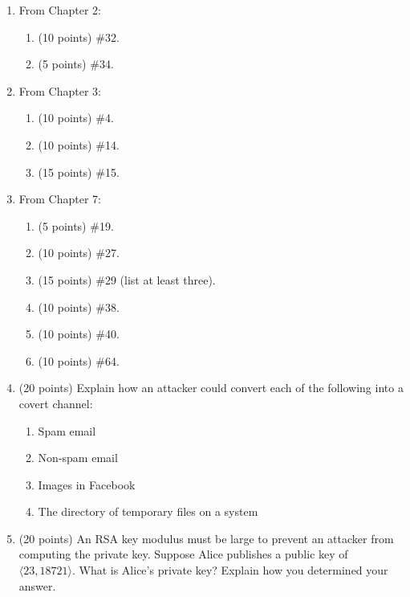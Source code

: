 \documentclass[letterpaper]{article}
\begin{document}
\begin{enumerate}

\item From Chapter 2:
\begin{enumerate}
\item (10 points) \#32.
\item (5 points) \#34.
\end{enumerate}

\item From Chapter 3:
\begin{enumerate}
\item (10 points) \#4.
\item (10 points) \#14.
\item (15 points) \#15.
\end{enumerate}

\item From Chapter 7:
\begin{enumerate}
\item (5 points) \#19.
\item (10 points) \#27.
\item (15 points) \#29 (list at least three).
\item (10 points) \#38.
\item (10 points) \#40.
\item (10 points) \#64.
\end{enumerate}

\item (20 points) Explain how an attacker could convert each of the following into a covert channel:
\begin{enumerate}
\item Spam email
\item Non-spam email
\item Images in Facebook
\item The directory of temporary files on a system
\end{enumerate}

\item (20 points) An RSA key modulus must be large to prevent an attacker from computing the private key. Suppose Alice publishes a public key of $\langle 23, 18721 \rangle$. What is Alice's private key? Explain how you determined your answer.


\end{enumerate}
\end{document}
